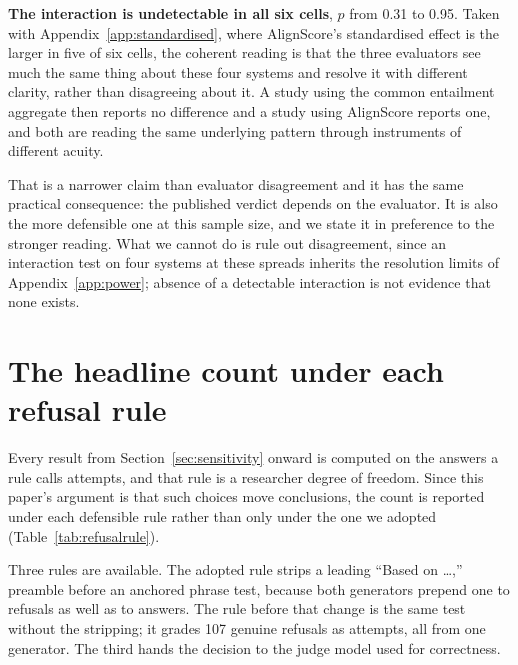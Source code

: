 \documentclass[11pt]{article}
\begin{document}
\textbf{The interaction is undetectable in all six cells}, $p$ from 0.31 to 0.95. Taken with Appendix~\ref{app:standardised}, where AlignScore's standardised effect is the larger in five of six cells, the coherent reading is that the three evaluators see much the same thing about these four systems and resolve it with different clarity, rather than disagreeing about it. A study using the common entailment aggregate then reports no difference and a study using AlignScore reports one, and both are reading the same underlying pattern through instruments of different acuity.

That is a narrower claim than evaluator disagreement and it has the same practical consequence: the published verdict depends on the evaluator. It is also the more defensible one at this sample size, and we state it in preference to the stronger reading. What we cannot do is rule out disagreement, since an interaction test on four systems at these spreads inherits the resolution limits of Appendix~\ref{app:power}; absence of a detectable interaction is not evidence that none exists.


\section{The headline count under each refusal rule}
\label{app:refusalrule}

Every result from Section~\ref{sec:sensitivity} onward is computed on the answers a rule calls attempts, and that rule is a researcher degree of freedom. Since this paper's argument is that such choices move conclusions, the count is reported under each defensible rule rather than only under the one we adopted (Table~\ref{tab:refusalrule}).

Three rules are available. The adopted rule strips a leading ``Based on \ldots,'' preamble before an anchored phrase test, because both generators prepend one to refusals as well as to answers. The rule before that change is the same test without the stripping; it grades 107 genuine refusals as attempts, all from one generator. The third hands the decision to the judge model used for correctness.
\end{document}
